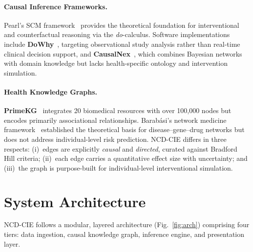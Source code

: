 \documentclass[runningheads]{llncs}
\begin{document}
\paragraph{Causal Inference Frameworks.}
Pearl's SCM framework~\cite{pearl2009causality} provides the
theoretical foundation for interventional and counterfactual reasoning
via the \emph{do}-calculus.  Software implementations include
\textbf{DoWhy}~\cite{sharma2020dowhy}, targeting observational study
analysis rather than real-time clinical decision support, and
\textbf{CausalNex}~\cite{beaumont2021causalnex}, which combines
Bayesian networks with domain knowledge but lacks health-specific
ontology and intervention simulation.

\paragraph{Health Knowledge Graphs.}
\textbf{PrimeKG}~\cite{chandak2023primekg} integrates 20 biomedical
resources with over 100{,}000 nodes but encodes primarily
associational relationships.  Barab\'{a}si's network medicine
framework~\cite{barabasi2011network} established the theoretical
basis for disease--gene--drug networks but does not address
individual-level risk prediction.  NCD-CIE differs in three respects:
(i)~edges are explicitly \emph{causal} and \emph{directed}, curated
against Bradford Hill criteria; (ii)~each edge carries a quantitative
effect size with uncertainty; and (iii)~the graph is purpose-built for
individual-level interventional simulation.

\section{System Architecture}\label{sec:arch}

NCD-CIE follows a modular, layered architecture (Fig.~\ref{fig:arch})
comprising four tiers: data ingestion, causal knowledge graph,
inference engine, and presentation layer.
\end{document}
